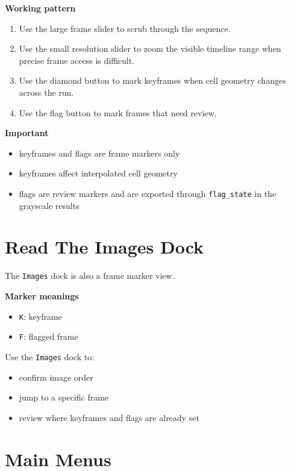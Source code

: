 \documentclass[
  9pt,
  letterpaper,
  oneside,
  open=any,
  DIV=15,
  parskip=half-,
  headings=big,
  numbers=noenddot
]{scrbook}
\newcommand{\manuallead}[1]{%
  \vspace{0.15em}%
  {\sffamily\bfseries\color{ManualBlue}#1}\par\nobreak\vspace{0.05em}%
}
\begin{document}
\manuallead{Working pattern}

\begin{enumerate}[leftmargin=*,itemsep=0.35em,topsep=0.4em]
\item Use the large frame slider to scrub through the sequence.
\item Use the small resolution slider to zoom the visible timeline range when precise frame access is difficult.
\item Use the diamond button to mark keyframes when cell geometry changes across the run.
\item Use the flag button to mark frames that need review.
\end{enumerate}

\manuallead{Important}

\begin{itemize}[leftmargin=*,itemsep=0.35em,topsep=0.4em]
\item keyframes and flags are frame markers only
\item keyframes affect interpolated cell geometry
\item flags are review markers and are exported through \texttt{flag\_state} in the grayscale results
\end{itemize}

\section{Read The Images Dock}

The \texttt{Images} dock is also a frame marker view.


\manuallead{Marker meanings}

\begin{itemize}[leftmargin=*,itemsep=0.35em,topsep=0.4em]
\item \texttt{K}: keyframe
\item \texttt{F}: flagged frame
\end{itemize}

Use the \texttt{Images} dock to:


\begin{itemize}[leftmargin=*,itemsep=0.35em,topsep=0.4em]
\item confirm image order
\item jump to a specific frame
\item review where keyframes and flags are already set
\end{itemize}

\section{Main Menus}
\end{document}
